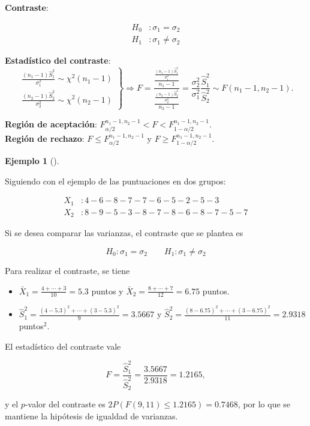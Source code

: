 \documentclass[
  a4paper,
]{scrreport}
\providecommand{\tightlist}{%
  \setlength{\itemsep}{0pt}\setlength{\parskip}{0pt}}\usepackage{longtable,booktabs,array}
\theoremstyle{definition}
\theoremstyle{definition}
\newtheorem{example}{Ejemplo}[chapter]
\theoremstyle{plain}
\theoremstyle{remark}
\begin{document}
\textbf{Contraste}:

\[
\begin{aligned}
H_0 &: \sigma_1=\sigma_2 \\
H_1 &: \sigma_1\neq \sigma_2
\end{aligned}
\]

\textbf{Estadístico del contraste}: \[\left.
\begin{array}{l}
\displaystyle \frac{(n_1-1)\hat{S}_1^2}{\sigma_1^2}\sim \chi^2(n_1-1) \\
\displaystyle \frac{(n_2-1)\hat{S}_2^2}{\sigma_2^2}\sim \chi^2(n_2-1)
\end{array}
\right\}
\Rightarrow
F= \frac{\frac{\frac{(n_1-1)\hat{S}_1^2}{\sigma_1^2}}{n_1-1}}{\frac{\frac{(n_2-1)\hat{S}_2^2}{\sigma_2^2}}{n_2-1}} =
\frac{\sigma_2^2}{\sigma_1^2}\frac{\hat{S}_1^2}{\hat{S}_2^2}\sim F(n_1-1,n_2-1).
\]

\textbf{Región de aceptación}:
\(F_{\alpha/2}^{n_1-1,n_2-1} < F < F_{1-\alpha/2}^{n_1-1,n_2-1}\).\\
\textbf{Región de rechazo}: \(F\leq F_{\alpha/2}^{n_1-1,n_2-1}\) y
\(F\geq F_{1-\alpha/2}^{n_1-1,n_2-1}\).

\begin{example}[]\protect\hypertarget{exm-contraste-comparacion-varianzas}{}\label{exm-contraste-comparacion-varianzas}

Siguiendo con el ejemplo de las puntuaciones en dos grupos:

\[
\begin{aligned}
X_1 &: 4 - 6 - 8 - 7 - 7 - 6 - 5 - 2 - 5 - 3  \\
X_2 &: 8 - 9 - 5 - 3 - 8 - 7 - 8 - 6 - 8 - 7 - 5 - 7
\end{aligned}
\]

Si se desea comparar las varianzas, el contraste que se plantea es

\[
H_0: \sigma_1=\sigma_2\qquad H_1: \sigma_1\neq \sigma_2
\]

Para realizar el contraste, se tiene

\begin{itemize}
\tightlist
\item
  \(\bar{X}_1 = \frac{4+\cdots +3}{10}=5.3\) puntos y
  \(\bar{X}_2=\frac{8+\cdots +7}{12}=6.75\) puntos.
\item
  \(\hat{S}_1^2= \frac{(4-5.3)^2+\cdots + (3-5.3)^2}{9}=3.5667\) y
  \(\hat{S}_2^2= \frac{(8-6.75)^2+\cdots + (3-6.75)^2}{11}=2.9318\)
  puntos\(^2\).
\end{itemize}

El estadístico del contraste vale

\[
F = \frac{\hat{S}_1^2}{\hat{S}_2^2} = \frac{3.5667}{2.9318}=1.2165,
\]

y el \(p\)-valor del contraste es \(2P(F(9,11)\leq 1.2165)=0.7468\), por
lo que se mantiene la hipótesis de igualdad de varianzas.

\end{example}
\end{document}
